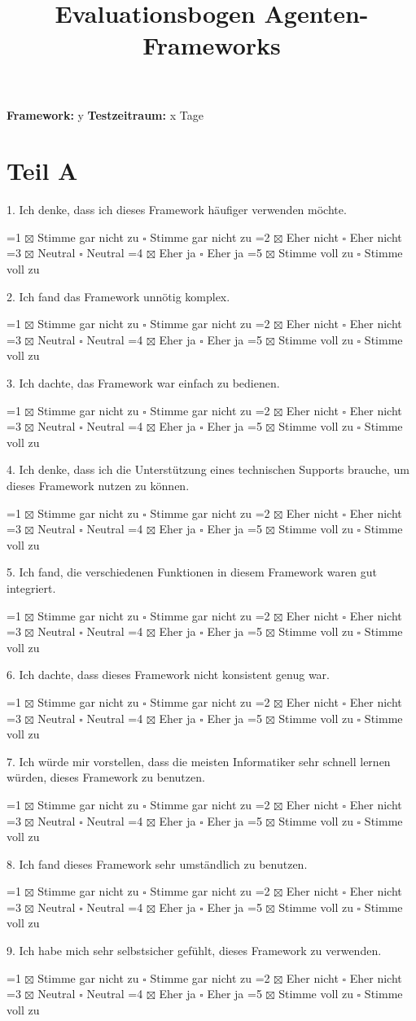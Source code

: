 \documentclass{article}
\title{Evaluationsbogen Agenten-Frameworks}
\date{}
\begin{document}
    
\maketitle
    
\vspace{-1.5cm}

\begin{center}
    \textbf{Framework:} y
    \textbf{Testzeitraum:} x Tage
\end{center}

\section*{Teil A}

\newcommand{\evalquestion}[2]{
    #1
    \begin{flushleft}
        \ifnum#2=1 $\boxtimes$ Stimme gar nicht zu \else $\square$ Stimme gar nicht zu \fi \quad
        \ifnum#2=2 $\boxtimes$ Eher nicht \else $\square$ Eher nicht \fi \quad
        \ifnum#2=3 $\boxtimes$ Neutral \else $\square$ Neutral \fi \quad
        \ifnum#2=4 $\boxtimes$ Eher ja \else $\square$ Eher ja \fi \quad
        \ifnum#2=5 $\boxtimes$ Stimme voll zu \else $\square$ Stimme voll zu \fi
    \end{flushleft}
}

\noindent
\evalquestion{1. Ich denke, dass ich dieses Framework häufiger verwenden möchte.}{0}

\noindent
\evalquestion{2. Ich fand das Framework unnötig komplex.}{0}

\noindent
\evalquestion{3. Ich dachte, das Framework war einfach zu bedienen.}{0}

\noindent
\evalquestion{4. Ich denke, dass ich die Unterstützung eines technischen Supports brauche, um dieses Framework nutzen zu können.}{0}

\noindent
\evalquestion{5. Ich fand, die verschiedenen Funktionen in diesem Framework waren gut integriert.}{0}

\noindent
\evalquestion{6. Ich dachte, dass dieses Framework nicht konsistent genug war.}{0}

\noindent
\evalquestion{7. Ich würde mir vorstellen, dass die meisten Informatiker sehr schnell lernen würden, dieses Framework zu benutzen.}{0}

\noindent
\evalquestion{8. Ich fand dieses Framework sehr umständlich zu benutzen.}{0}

\noindent
\evalquestion{9. Ich habe mich sehr selbstsicher gefühlt, dieses Framework zu verwenden.}{0}
\end{document}
